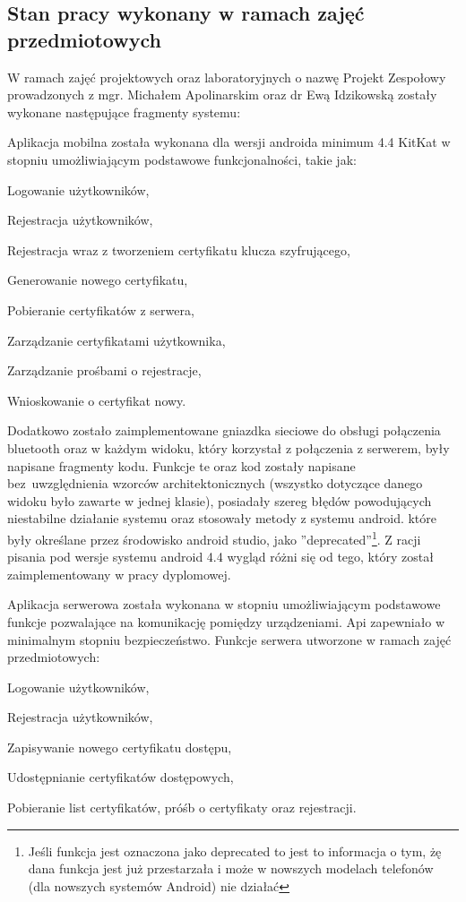\newpage
\subsection{Stan pracy wykonany w ramach zajęć \newline przedmiotowych} \label{sec:Stan pracy wykonany w ramach zajęć przedmiotowych}
W ramach zajęć projektowych oraz laboratoryjnych o nazwę Projekt Zespołowy prowadzonych z mgr. Michałem Apolinarskim oraz dr Ewą Idzikowską zostały wykonane następujące fragmenty systemu:
	
	Aplikacja mobilna została wykonana dla wersji androida minimum 4.4 KitKat w stopniu umożliwiającym podstawowe funkcjonalności, takie jak:
	\begin{itemize*}
		\item Logowanie użytkowników,
		\item Rejestracja użytkowników,
		\item Rejestracja wraz z tworzeniem certyfikatu klucza szyfrującego,
		\item Generowanie nowego certyfikatu,
		\item Pobieranie certyfikatów z serwera,
		\item Zarządzanie certyfikatami użytkownika,
		\item Zarządzanie prośbami o rejestracje,
		\item Wnioskowanie o certyfikat nowy.
	\end{itemize*}

		Dodatkowo zostało zaimplementowane gniazdka sieciowe do obsługi połączenia bluetooth oraz w każdym widoku, który korzystał z połączenia z serwerem, były napisane fragmenty kodu. Funkcje te oraz kod zostały napisane bez~uwzględnienia wzorców architektonicznych (wszystko dotyczące danego widoku było zawarte w jednej klasie), posiadały szereg błędów powodujących niestabilne działanie systemu oraz stosowały metody z systemu android. które były określane przez środowisko android studio, jako ''deprecated''\footnote{ Jeśli funkcja jest oznaczona jako deprecated to jest to informacja o tym, żę dana funkcja jest już przestarzała i może w nowszych modelach telefonów (dla nowszych systemów Android) nie działać}. Z racji pisania pod wersje systemu android 4.4 wygląd różni się od tego, który został zaimplementowany w pracy dyplomowej.

   Aplikacja serwerowa została wykonana w stopniu umożliwiającym podstawowe funkcje pozwalające na komunikację pomiędzy urządzeniami. Api zapewniało w minimalnym stopniu bezpieczeństwo. Funkcje serwera utworzone w ramach zajęć przedmiotowych:
   	\begin{itemize*}
   		\item Logowanie użytkowników,
   		\item Rejestracja użytkowników,
   		\item Zapisywanie nowego certyfikatu dostępu,
   		\item Udostępnianie certyfikatów dostępowych,
   		\item Pobieranie list certyfikatów, próśb o certyfikaty oraz rejestracji.
   	\end{itemize*}
   
